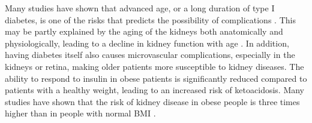 \documentclass[sn-mathphys-num]{sn-jnl}%
\theoremstyle{thmstyleone}%
\theoremstyle{thmstyletwo}%
\theoremstyle{thmstylethree}%
\begin{document}


Many studies have shown that advanced age, or a long duration of type I diabetes, is one of the risks that predicts the possibility of complications \cite{chen2020incidence} \cite{orban2014incidence}. 
This may be partly explained by the aging of the kidneys both anatomically and physiologically, leading to a decline in kidney function with age \cite{glassock2012implications}. 
In addition, having diabetes itself also causes microvascular complications, especially in the kidneys or retina, making older patients more susceptible to kidney diseases.  
The ability to respond to insulin in obese patients is significantly reduced compared to patients with a healthy weight, leading to an increased risk of ketoacidosis. Many studies have shown that the risk of kidney disease in obese people is three times higher than in people with normal BMI \cite{helliwell2021body} \cite{bhagadurshah2023impact}.

\end{document}
